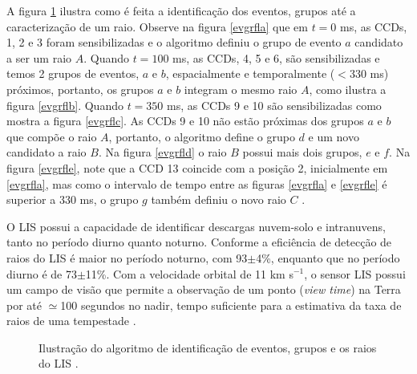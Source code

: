 A figura \ref{LisImagemProcessa} ilustra como é feita a identificação dos  eventos, grupos até a caracterização de um raio. Observe na figura \ref{evgrfla} que em $t=0$ ms, as CCDs, 1, 2 e 3  foram sensibilizadas e o algoritmo definiu o grupo de evento $a$ candidato a ser um raio $A$.  Quando $t=100$ ms, as CCDs, 4, 5 e 6, são sensibilizadas e temos 2 grupos de eventos, $a$ e $b$, espacialmente e temporalmente ($<$330 ms) próximos, portanto, os grupos $a$ e $b$ integram o mesmo raio $A$, como ilustra a figura \ref{evgrflb}. Quando $t = 350$ ms, as CCDs 9 e 10 são sensibilizadas como mostra a figura \ref{evgrflc}. As CCDs 9 e 10 não estão próximas dos grupos $a$ e $b$ que compõe o raio $A$, portanto, o algoritmo define o grupo $d$ e um novo candidato a raio $B$. Na figura \ref{evgrfld} o raio $B$ possui mais dois grupos, $e$ e $f$. Na figura \ref{evgrfle}, note que a CCD 13 coincide com a posição 2, inicialmente em \ref{evgrfla}, mas como o intervalo de tempo entre as figuras \ref{evgrfla} e \ref{evgrfle} é superior a 330 ms, o grupo $g$ também definiu o novo raio $C$ \cite{christian2000LISalgorithm}.  

     
O LIS possui a capacidade de identificar descargas nuvem-solo e intranuvens, tanto no período diurno quanto noturno. Conforme  a eficiência de detecção de raios do LIS é maior no período noturno, com 93$\pm$4\%, enquanto que no período diurno é de 73$\pm$11\%.  Com a velocidade orbital de 11 km s$^{-1}$, o sensor LIS possui um campo de visão que permite a observação de um ponto (\textit{view time}) na Terra por até $\simeq$100 segundos no nadir, tempo suficiente para a estimativa da taxa de raios de uma tempestade \cite{christianTM,trmmhandbook}.


\begin{figure}[!ht]
\caption{Ilustração do algoritmo de identificação de eventos, grupos e os raios do LIS \cite{christian2000LISalgorithm}.}
\label{LisImagemProcessa} 
\end{figure} 


